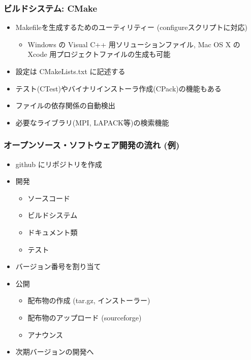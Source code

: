 \begin{frame}
  \frametitle{ビルドシステム: CMake}
  \begin{itemize}
    \setlength{\itemsep}{1em}
  \item Makefileを生成するためのユーティリティー (configureスクリプトに対応)
    \begin{itemize}
    \item Windows の Visual C++ 用ソリューションファイル, Mac OS X の Xcode 用プロジェクトファイルの生成も可能
    \end{itemize}
  \item 設定は CMakeLists.txt に記述する
  \item テスト(CTest)やバイナリインストーラ作成(CPack)の機能もある
  \item ファイルの依存関係の自動検出
  \item 必要なライブラリ(MPI, LAPACK等)の検索機能
  \end{itemize}
\end{frame}

\begin{frame}
  \frametitle{オープンソース・ソフトウェア開発の流れ (例)}
  \begin{itemize}
  \item github にリポジトリを作成
  \item 開発
    \begin{itemize}
    \item ソースコード
    \item ビルドシステム
    \item ドキュメント類
    \item テスト
    \end{itemize}
  \item バージョン番号を割り当て
  \item 公開
    \begin{itemize}
    \item 配布物の作成 (tar.gz, インストーラー)
    \item 配布物のアップロード (sourceforge)
    \item アナウンス
    \end{itemize}
  \item 次期バージョンの開発へ
  \end{itemize}
\end{frame}

